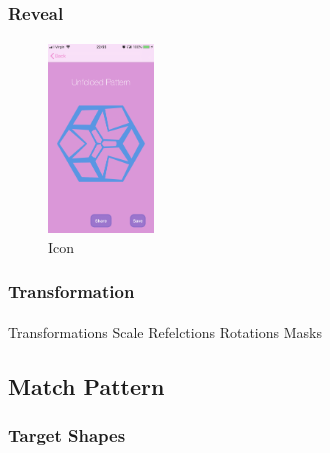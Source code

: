 \documentclass[11pt]{article}
\begin{document}
    \subsubsection{Reveal}
    
            \paragraph{}
            
            \begin{figure}
                        \centering
                        \includegraphics[width=0.25\textwidth]{KiriZen/createUnfoldedPattern.png}
                        \caption{Icon}
                        \label{fig:kiriZen-createUnfoldedPattern}
                    \end{figure}

        \subsubsection{Transformation}
        
                \paragraph{}
                
                Transformations
                Scale
                Refelctions
                Rotations
                Masks



    \subsection{Match Pattern}

        \subsubsection{Target Shapes}
            
\end{document}
